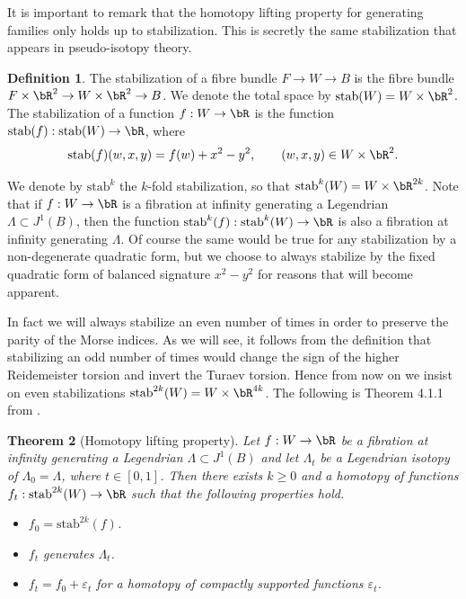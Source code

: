 \documentclass[JEP,XML,SOM,Unicode,NoFloatCountersInSection]{cedram}
\newcommand{\stab}{\mathrm{stab}}
\theoremstyle{plain}
\newtheorem{theorem}{Theorem}[section]
\theoremstyle{definition}
\newtheorem{definition}[theorem]{Definition}
\begin{document}
It is important to remark that the homotopy lifting property for generating families only holds up to stabilization. This is secretly the same stabilization that appears in pseudo-isotopy theory.
\begin{definition}
The stabilization of a fibre bundle $F \to W \to B$ is the fibre bundle $F \times \bR^2 \to W \times \bR^2 \to B$. We denote the total space by $\stab (W)=W \times \bR^2$. The stabilization of a function $f:W \to \bR$ is the function $\stab (f): \stab (W) \to \bR$, where
\[ \stab (f)(w,x,y)=f(w)+x^2-y^2, \quad \quad (w,x,y) \in W \times \bR^2. \]
\end{definition}

We denote by $\stab ^k$ the $k$-fold stabilization, so that $\stab ^{k}(W)=W \times \bR^{2k}$. Note that if $f:W \to \bR$ is a fibration at infinity generating a Legendrian $\Lambda \subset J^1(B)$, then the function $\stab ^{k}(f): \stab ^{k}(W) \to \bR$ is also a fibration at infinity generating $\Lambda$. Of course the same would be true for any stabilization by a non-degenerate quadratic form, but we choose to always stabilize by the fixed quadratic form of balanced signature $x^2-y^2$ for reasons that will become apparent.

In fact we will always stabilize an even number of times in order to preserve the parity of the Morse indices. As we will see, it follows from the definition that stabilizing an odd number of times would change the sign of the higher Reidemeister torsion and invert the Turaev torsion. Hence from now on we insist on even stabilizations $\stab ^{2k}(W)=W \times \bR^{4k}$. The following is Theorem 4.1.1 from \cite{EG98}.

\begin{theorem}[Homotopy lifting property]\label{Persistence Theorem}
Let $f:W \to \bR$ be a fibration at infinity generating a Legendrian $\Lambda \subset J^1(B)$ and let $ \Lambda_t $ be a Legendrian isotopy of $\Lambda_0=\Lambda$, where $t \in [0,1]$. Then there exists $k\geq0$ and a homotopy of functions $f_t: \stab ^{2k}(W) \to \bR$ such that the following properties hold.
\begin{itemize}
\item $f_0=\stab ^{2k}(f)$.
\item $f_t$ generates $\Lambda_t$.
\item $f_t=f_0+ \varepsilon_t$ for a homotopy of compactly supported functions $\varepsilon_t$.
\end{itemize}
\end{theorem}
\end{document}
